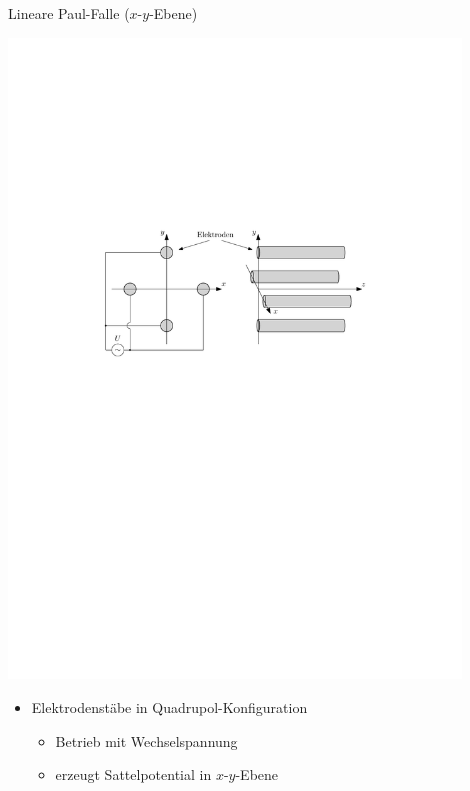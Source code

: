 \documentclass[12pt,xcolor=dvipsnames]{beamer}
\begin{document}
\begin{frame}{Lineare Paul-Falle ($x$-$y$-Ebene)}
	\begin{center}
		\includegraphics[width=0.9\textwidth]{./figures/lineare_paulfalle_ohne_endkappen.pdf}
	\end{center}
	\vspace{-0.3cm}
	\begin{itemize}
		\setlength\itemsep{1em}
		\item Elektrodenstäbe in Quadrupol-Konfiguration
		\begin{itemize}
			\item Betrieb mit Wechselspannung
			\item erzeugt Sattelpotential in $x$-$y$-Ebene
		\end{itemize}
		
		\end{itemize}
\end{frame}
\end{document}
